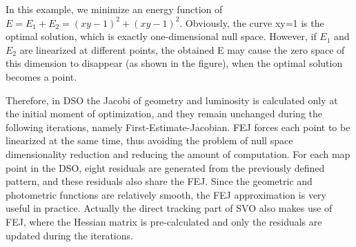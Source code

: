 \documentclass[a4paper,10pt]{article}
\begin{document}

	In this example, we minimize an energy function of $E=E_1+E_2=(xy-1)^2+(xy-1)^2$. Obviously, the curve xy=1 is the optimal solution, which is exactly one-dimensional null space. However, if $E_1$ and $E_2$ are linearized at different points, the obtained E may cause the zero space of this dimension to disappear (as shown in the figure), when the optimal solution becomes a point.
	
	Therefore, in DSO the Jacobi of geometry and luminosity is calculated only at the initial moment of optimization, and they remain unchanged during the following iterations, namely First-Estimate-Jacobian. FEJ forces each point to be linearized at the same time, thus avoiding the problem of null space dimensionality reduction and reducing the amount of computation. For each map point in the DSO, eight residuals are generated from the previously defined pattern, and these residuals also share the FEJ. Since the geometric and photometric functions are relatively smooth, the FEJ approximation is very useful in practice. Actually the direct tracking part of SVO \cite{forster2014svo} also makes use of FEJ, where the Hessian matrix is pre-calculated and only the residuals are updated during the iterations. 
			
	
	
	
\end{document}

